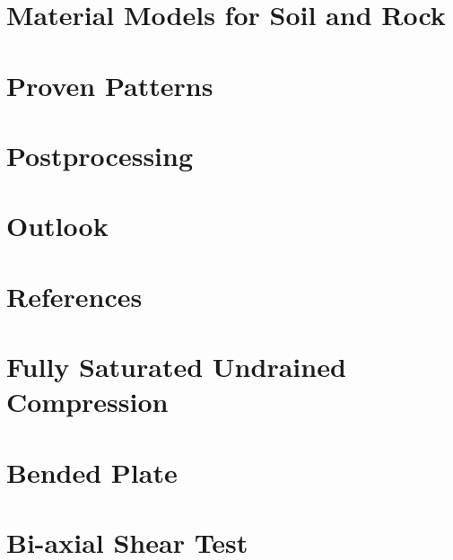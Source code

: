 \documentclass[12pt,a4paper]{report}
\begin{document}
\chapter{Material Models for Soil and Rock}
\label{chap:materials}


\chapter{Proven Patterns}
\label{chap:patterns}


\chapter{Postprocessing}
\label{chap:postprocessing}


\chapter{Outlook}
\label{chap:outlook}


\chapter{References}
\label{chap:references}


\appendix
\chapter{Fully Saturated Undrained Compression}
\label{app:fully-saturated-undrained-compression}


\chapter{Bended Plate}
\label{app:bended-plate}


\chapter{Bi-axial Shear Test}
\label{app:bi-axial-shear}

\end{document}
